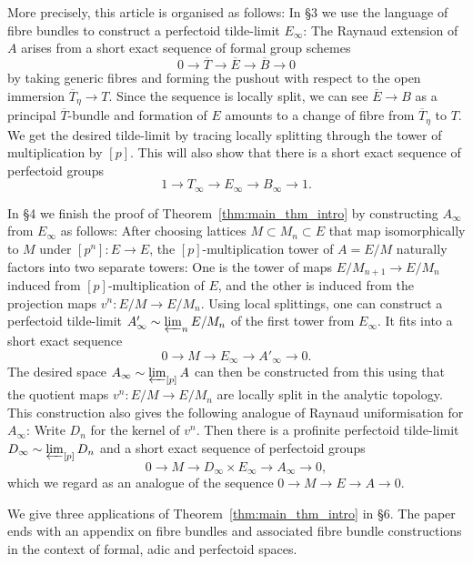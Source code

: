 \documentclass[10pt,oneside]{amsart}
\theoremstyle{definition}
\begin{document}
More precisely, this article is organised as follows: In \S3 we use the language of fibre bundles to construct a perfectoid tilde-limit $E_\infty$: The Raynaud extension of $A$ arises from a short exact sequence of formal group schemes
\[0\rightarrow \overline{T}\rightarrow \overline{E}\rightarrow \overline{B}\rightarrow 0\]
by taking generic fibres and forming the pushout with respect to the open immersion $\overline{T}_\eta\rightarrow T$. Since the sequence is locally split, we can see $\overline{E}\rightarrow B$ as a principal $\overline{T}$-bundle and formation of $E$ amounts to a change of fibre from $\overline{T}_\eta$ to $T$. We get the desired tilde-limit by tracing locally splitting through the tower of multiplication by $[p]$. This will also show that there is a short exact sequence of perfectoid groups
\[ 1\to T_\infty \to E_\infty \to B_\infty \to 1.\]

In \S4 we finish the proof of Theorem~\ref{thm:main_thm_intro} by constructing $A_\infty$ from $E_\infty$ as follows: After choosing lattices $M\subset M_n\subset E$ that map isomorphically to $M$ under $[p^n]\colon E\rightarrow E$, the $[p]$-multiplication tower of $A=E/M$ naturally factors into two separate towers: One is the tower of maps $E/M_{n+1}\rightarrow E/M_n$ induced from $[p]$-multiplication of $E$, and the other is induced from the projection maps $v^n\colon E/M\rightarrow E/M_n$. Using local splittings, one can construct a perfectoid tilde-limit $A'_\infty\sim \varprojlim_n E/M_n$ of the first tower from $E_\infty$. It fits into a short exact sequence
\[0\to M\to E_\infty\to A'_\infty\to 0. \]
 The desired space $A_\infty\sim \varprojlim_{[p]}A$ can then be constructed from this using that the quotient maps $v^n\colon E/M\rightarrow E/M_n$ are locally split in the analytic topology. This construction also gives the following analogue of Raynaud uniformisation for $A_\infty$: Write $D_n$ for the kernel of $v^n$. Then there is a profinite perfectoid tilde-limit $D_\infty\sim \varprojlim_{[p]} D_n$ and a short exact sequence of perfectoid groups
\[0\rightarrow M\rightarrow D_\infty \times E_\infty \rightarrow A_\infty\rightarrow 0,\]
which we regard as an analogue of the sequence $0\rightarrow M\rightarrow E\rightarrow A\rightarrow 0$.

We give three applications of Theorem~\ref{thm:main_thm_intro} in \S 6. The paper ends with an appendix on fibre bundles and associated fibre bundle constructions in the context of formal, adic and perfectoid spaces.
\end{document}
